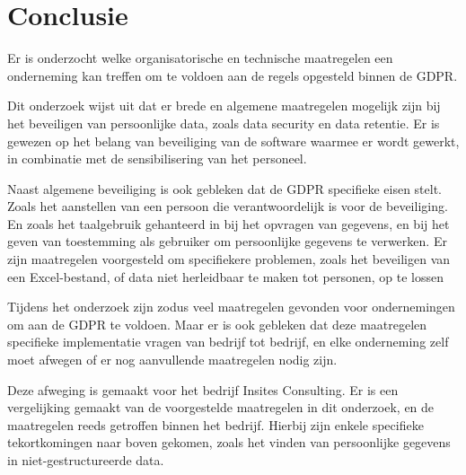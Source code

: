 
\chapter{Conclusie}
\label{ch:conclusie}

Er is onderzocht welke organisatorische en technische maatregelen een onderneming kan treffen om te voldoen aan de regels opgesteld binnen de GDPR. 

Dit onderzoek wijst uit dat er brede en algemene maatregelen mogelijk zijn bij het beveiligen van persoonlijke data, zoals data security en data retentie. 
Er is gewezen op het belang van beveiliging van de software waarmee er wordt gewerkt, in combinatie met de sensibilisering van het personeel. 

Naast algemene beveiliging is ook gebleken dat de GDPR specifieke eisen stelt. Zoals het aanstellen van een persoon die verantwoordelijk is voor de beveiliging. En zoals het taalgebruik gehanteerd in bij het opvragen van gegevens, en bij het geven van toestemming als gebruiker om persoonlijke gegevens te verwerken. 
Er zijn maatregelen voorgesteld om specifiekere problemen, zoals het beveiligen van een Excel-bestand, of data niet herleidbaar te maken tot personen, op te lossen  

Tijdens het onderzoek zijn zodus veel maatregelen gevonden voor ondernemingen om aan de GDPR te voldoen. Maar er is ook gebleken dat deze maatregelen specifieke implementatie vragen van bedrijf tot bedrijf, en elke onderneming zelf moet afwegen of er nog aanvullende maatregelen nodig zijn. 

Deze afweging is gemaakt voor het bedrijf Insites Consulting. Er is een vergelijking gemaakt van de voorgestelde maatregelen in dit onderzoek, en de maatregelen reeds getroffen binnen het bedrijf. Hierbij zijn enkele specifieke tekortkomingen naar boven gekomen, zoals het vinden van persoonlijke gegevens in niet-gestructureerde data. 

